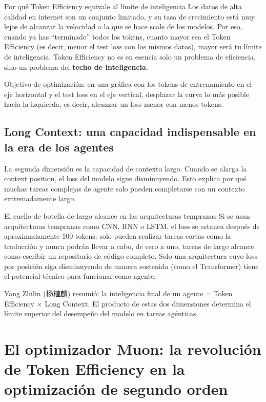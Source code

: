 \documentclass[a4paper]{article}
\begin{document}
\begin{importantbox}{Por qué Token Efficiency equivale al límite de inteligencia}
Los datos de alta calidad en internet son un conjunto limitado, y su tasa de crecimiento está muy lejos de alcanzar la velocidad a la que se hace scale de los modelos. Por eso, cuando ya has ``terminado'' todos los tokens, cuanto mayor sea el Token Efficiency (es decir, menor el test loss con los mismos datos), mayor será tu límite de inteligencia. Token Efficiency no es en esencia solo un problema de eficiencia, sino un problema del \textbf{techo de inteligencia}.
\end{importantbox}

Objetivo de optimización: en una gráfica con los tokens de entrenamiento en el eje horizontal y el test loss en el eje vertical, desplazar la curva lo más posible hacia la izquierda, es decir, alcanzar un loss menor con menos tokens.

\subsection{Long Context: una capacidad indispensable en la era de los agentes}

La segunda dimensión es la capacidad de contexto largo. Cuando se alarga la context position, el loss del modelo sigue disminuyendo. Esto explica por qué muchas tareas complejas de agente solo pueden completarse con un contexto extremadamente largo.

\begin{warningbox}{El cuello de botella de largo alcance en las arquitecturas tempranas}
Si se usan arquitecturas tempranas como CNN, RNN o LSTM, el loss se estanca después de aproximadamente 100 tokens: solo pueden realizar tareas cortas como la traducción y nunca podrán llevar a cabo, de cero a uno, tareas de largo alcance como escribir un repositorio de código completo. Solo una arquitectura cuyo loss por posición siga disminuyendo de manera sostenida (como el Transformer) tiene el potencial técnico para funcionar como agente.
\end{warningbox}

Yang Zhilin (杨植麟) resumió: la inteligencia final de un agente = Token Efficiency $\times$ Long Context. El producto de estas dos dimensiones determina el límite superior del desempeño del modelo en tareas agénticas.

\section{El optimizador Muon: la revolución de Token Efficiency en la optimización de segundo orden}
\end{document}
